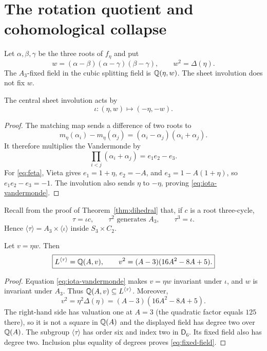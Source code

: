 \section{The rotation quotient and cohomological collapse}\label{sec:collapse}

Let $\alpha,\beta,\gamma$ be the three roots of $f_\eta$ and put
\begin{equation}\label{eq:vandermonde}
 w=(\alpha-\beta)(\alpha-\gamma)(\beta-\gamma),
 \qquad
 w^2=\Delta(\eta).
\end{equation}
The $A_3$-fixed field in the cubic splitting field is $\mathbb Q(\eta,w)$.
The sheet involution does not fix $w$.

\begin{lemma}\label{lem:vandermonde-sign}
The central sheet involution acts by
\begin{equation}\label{eq:iota-vandermonde}
 \iota:(\eta,w)\longmapsto(-\eta,-w).
\end{equation}
\end{lemma}

\begin{proof}
The matching map sends a difference of two roots to
\[
 m_\eta(\alpha_i)-m_\eta(\alpha_j)
 =(\alpha_i-\alpha_j)(\alpha_i+\alpha_j).
\]
It therefore multiplies the Vandermonde by
\[
 \prod_{i<j}(\alpha_i+\alpha_j)=e_1e_2-e_3.
\]
For \eqref{eq:feta}, Vieta gives
$e_1=1+\eta$, $e_2=-A$, and $e_3=1-A(1+\eta)$, so
$e_1e_2-e_3=-1$.  The involution also sends $\eta$ to $-\eta$, proving
\eqref{eq:iota-vandermonde}.
\end{proof}

Recall from the proof of Theorem~\ref{thm:dihedral} that, if $c$ is a root
three-cycle,
\begin{equation}\label{eq:tau-subgroup}
 \tau=\iota c,\qquad
 \tau^2\text{ generates }A_3,\qquad
 \tau^3=\iota.
\end{equation}
Hence $\langle\tau\rangle=A_3\times\langle\iota\rangle$ inside
$S_3\times C_2$.

\begin{proposition}\label{prop:fixed-field}
Let $v=\eta w$.  Then
\begin{equation}\label{eq:fixed-field}
 \boxed{
 L^{\langle\tau\rangle}=\mathbb Q(A,v),
 \qquad
 v^2=(A-3)(16A^2-8A+5).}
\end{equation}
\end{proposition}

\begin{proof}
Equation \eqref{eq:iota-vandermonde} makes $v=\eta w$ invariant under
$\iota$, and $w$ is invariant under $A_3$.  Thus
$\mathbb Q(A,v)\subseteq L^{\langle\tau\rangle}$.  Moreover,
\[
 v^2=\eta^2\Delta(\eta)
 =(A-3)(16A^2-8A+5).
\]
The right-hand side has valuation one at $A=3$ (the quadratic factor equals
$125$ there), so it is not a square in $\mathbb Q(A)$ and the displayed field has
degree two over $\mathbb Q(A)$.  The subgroup $\langle\tau\rangle$ has order six
and index two in $\mathsf D_6$.  Its fixed field also has degree two.
Inclusion plus equality of degrees proves \eqref{eq:fixed-field}.
\end{proof}


